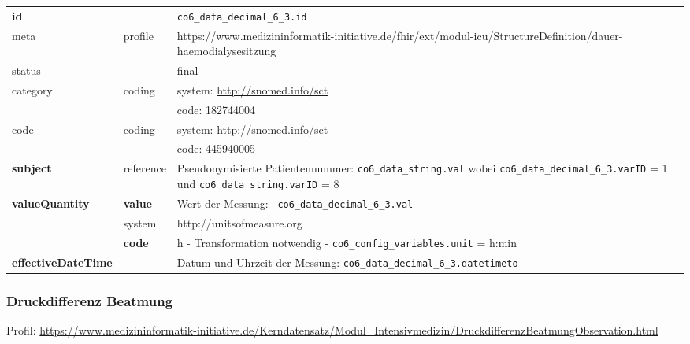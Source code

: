 \begin{longtable}{|l|l|p{7.5cm}|}
	\hline
	\rowcolor{lightgray} \multicolumn{3}{|l|}{Data Mapping (inhaltlich)} \\ \hline
	\textbf{id} &  & \texttt{co6\_data\_decimal\_6\_3.id} \\ \hline
	meta & profile & https://www.medizininformatik-initiative.de/fhir/ext/modul-icu/StructureDefinition/dauer-haemodialysesitzung \\ \hline 
	status &  & final   \\ \hline 
	category & coding & system: \url{http://snomed.info/sct} \\
	\cline{3-3}
	& & code: 182744004 \\ \hline
	code & coding & system: \url{http://snomed.info/sct} \\ 
	\cline{3-3} 
	&  & code: 445940005 \\ \hline
	\textbf{subject} & reference & Pseudonymisierte Patientennummer: \texttt{co6\_data\_string.val} wobei \texttt{co6\_data\_decimal\_6\_3.varID} = 1 und \texttt{co6\_data\_string.varID} = 8 \\ \hline
	\textbf{valueQuantity}  & \textbf{value} & Wert der Messung: \texttt{
		co6\_data\_decimal\_6\_3.val} \\
	\cline{2-3}
	& system & http://unitsofmeasure.org \\
	\cline{2-3}
	& \textbf{code} & h - Transformation notwendig - \texttt{co6\_config\_variables.unit} = h:min
	\\ \hline
	\textbf{effectiveDateTime}  & & Datum und Uhrzeit der Messung: \texttt{co6\_data\_decimal\_6\_3.datetimeto} \\
	\hline
\end{longtable}

\subsubsection{Druckdifferenz Beatmung} 

 Profil: \url{https://www.medizininformatik-initiative.de/Kerndatensatz/Modul_Intensivmedizin/DruckdifferenzBeatmungObservation.html}


